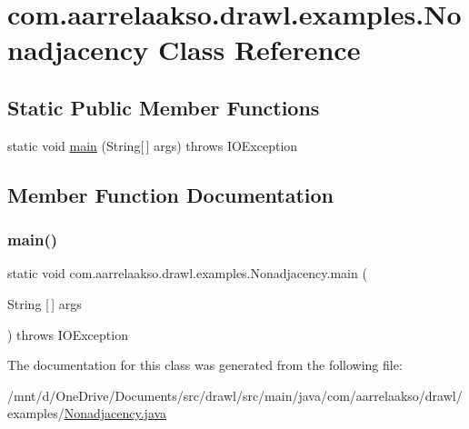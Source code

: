 \hypertarget{classcom_1_1aarrelaakso_1_1drawl_1_1examples_1_1_nonadjacency}{}\section{com.\+aarrelaakso.\+drawl.\+examples.\+Nonadjacency Class Reference}
\label{classcom_1_1aarrelaakso_1_1drawl_1_1examples_1_1_nonadjacency}
\subsection*{Static Public Member Functions}
\begin{DoxyCompactItemize}
\item 
static void \hyperlink{classcom_1_1aarrelaakso_1_1drawl_1_1examples_1_1_nonadjacency_a41d8f11e6e03cf95442b5149f2848183}{main} (String\mbox{[}$\,$\mbox{]} args)  throws I\+O\+Exception     
\end{DoxyCompactItemize}


\subsection{Member Function Documentation}
\mbox{\label{classcom_1_1aarrelaakso_1_1drawl_1_1examples_1_1_nonadjacency_a41d8f11e6e03cf95442b5149f2848183}} 
\subsubsection{\texorpdfstring{main()}{main()}}
{\footnotesize\ttfamily static void com.\+aarrelaakso.\+drawl.\+examples.\+Nonadjacency.\+main (\begin{DoxyParamCaption}\item[{String \mbox{[}$\,$\mbox{]}}]{args }\end{DoxyParamCaption}) throws I\+O\+Exception\hspace{0.3cm}{\ttfamily [static]}}



The documentation for this class was generated from the following file\+:\begin{DoxyCompactItemize}
\item 
/mnt/d/\+One\+Drive/\+Documents/src/drawl/src/main/java/com/aarrelaakso/drawl/examples/\hyperlink{_nonadjacency_8java}{Nonadjacency.\+java}\end{DoxyCompactItemize}
